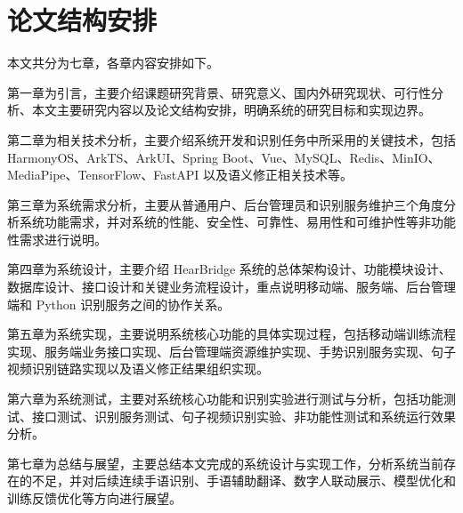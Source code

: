 
\section{论文结构安排}

本文共分为七章，各章内容安排如下。

第一章为引言，主要介绍课题研究背景、研究意义、国内外研究现状、可行性分析、本文主要研究内容以及论文结构安排，明确系统的研究目标和实现边界。

第二章为相关技术分析，主要介绍系统开发和识别任务中所采用的关键技术，包括 HarmonyOS、ArkTS、ArkUI、Spring Boot、Vue、MySQL、Redis、MinIO、MediaPipe、TensorFlow、FastAPI 以及语义修正相关技术等。

第三章为系统需求分析，主要从普通用户、后台管理员和识别服务维护三个角度分析系统功能需求，并对系统的性能、安全性、可靠性、易用性和可维护性等非功能性需求进行说明。

第四章为系统设计，主要介绍 HearBridge 系统的总体架构设计、功能模块设计、数据库设计、接口设计和关键业务流程设计，重点说明移动端、服务端、后台管理端和 Python 识别服务之间的协作关系。

第五章为系统实现，主要说明系统核心功能的具体实现过程，包括移动端训练流程实现、服务端业务接口实现、后台管理端资源维护实现、手势识别服务实现、句子视频识别链路实现以及语义修正结果组织实现。

第六章为系统测试，主要对系统核心功能和识别实验进行测试与分析，包括功能测试、接口测试、识别服务测试、句子视频识别实验、非功能性测试和系统运行效果分析。

第七章为总结与展望，主要总结本文完成的系统设计与实现工作，分析系统当前存在的不足，并对后续连续手语识别、手语辅助翻译、数字人联动展示、模型优化和训练反馈优化等方向进行展望。
